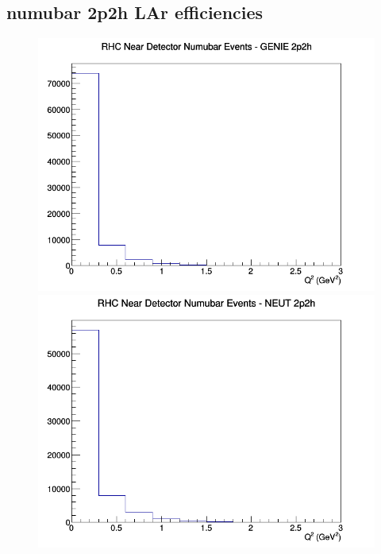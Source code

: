 \subsection{numubar 2p2h LAr efficiencies}
\begin{figure}[h]
\includegraphics[width=\linewidth]{eff_Q2/LAr/2p2h_RHC_ND_numubar_Q2_GENIE.png}
\endminipage
{}
\includegraphics[width=\linewidth]{eff_Q2/LAr/2p2h_RHC_ND_numubar_Q2_NEUT.png}
\endminipage
{}

\end{figure}
